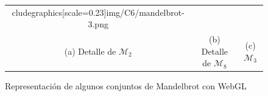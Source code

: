 \begin{figure}[ht]
\begin{tabular}{ccc}
cludegraphics[scale=0.23]{img/C6/mandelbrot-3.png} \\
    (a) Detalle de $\mathcal{M}_2$ & (b) Detalle de $\mathcal{M}_8$ & (c) $\mathcal{M}_3$ \\[6pt]
    \end{tabular}
    \caption{Representación de algunos conjuntos de Mandelbrot con WebGL}
    \label{fig:mandelbrot-webgl}
\end{figure}

